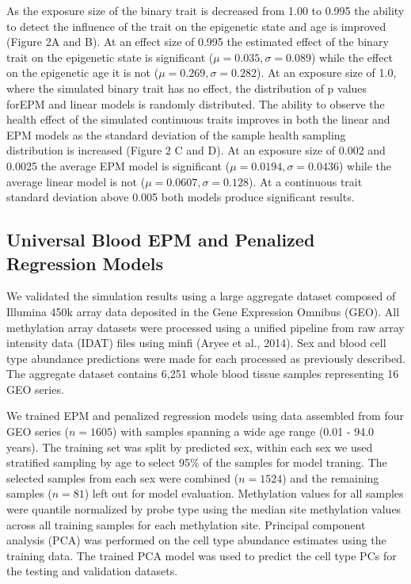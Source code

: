 \documentclass{article}
\begin{document}
{\begin{linenumbers}
As the exposure size of the binary trait is decreased from 1.00 to 0.995 the ability to detect the influence of the 
trait on the epigenetic state and age is improved (Figure 2A and B). At an effect size of 0.995 the estimated effect 
of the binary trait on the epigenetic state is significant ($\mu =0.035, \sigma=0.089$) while the effect on the 
epigenetic age it is not ($\mu=0.269, \sigma=0.282$). At an exposure size of 1.0, where the simulated binary trait 
has no effect, the distribution of p values forEPM and linear models is randomly distributed. The ability to observe 
the health effect of the simulated continuous traits improves in both the linear and EPM models as the standard 
deviation of the sample health sampling distribution is increased (Figure 2 C and D). At an exposure size of 0.002 
and 0.0025 the average EPM model is significant ($\mu=0.0194, \sigma=0.0436$) while the average linear model is not 
($\mu=0.0607, \sigma=0.128$). At a continuous trait standard deviation above 0.005 both models produce significant 
results. 

\subsection{Universal Blood EPM and Penalized Regression Models}

We validated the simulation results using a  large aggregate dataset composed of Illumina 450k array 
data\cite{Marabita2018-yi,Ventham2016-qj,Tan2014-ns,Johnson2020-vb,Voisin2015-ch,Soriano-Tarraga2016-tf,
Dabin_undated-pr,Horvath2015-af,Kurushima2019-gc,Zannas2019-bc,Braun2019-gp,Demetriou2013-jx,Tserel2015-qr} 
deposited in the Gene Expression Omnibus\cite{Barrett2012-gu} (GEO). All methylation array datasets were processed 
using a unified pipeline from raw array intensity data (IDAT) files using minfi (Aryee et al., 2014). Sex and blood 
cell type abundance predictions were made for each processed as previously described\cite{Houseman2012-rr,Aryee2014-ky}. 
The aggregate dataset contains 6,251 whole blood tissue samples representing 16 GEO series. 

We trained EPM and penalized regression models using data assembled from four GEO 
series\cite{Johansson2013-of,Liu2013-qo,Butcher2017-nr,Damaso2020-gd}  ($n=1605$) with samples spanning a wide age 
range (0.01 - 94.0 years). The training set was split by predicted sex, within each sex we used stratified sampling by 
age to select 95\% of the samples for model traning. The selected samples from each sex were combined 
($n=1524$) and the remaining samples ($n=81$) left out for  model evaluation. Methylation values for all samples were 
quantile normalized by probe type\cite{Horvath2013-sk} using the median site methylation values across all training 
samples for each methylation site.  Principal component analysis (PCA) was performed on the cell type abundance 
estimates using the training data. The trained PCA model was used to predict the cell type PCs for the testing 
and validation datasets. 


\end{linenumbers}}
\end{document}

